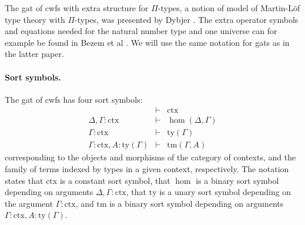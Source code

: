 \documentclass[11pt,a4paper]{article}
\theoremstyle{plain}
\theoremstyle{definition}
\newcommand{\ctx}{\mathrm{ctx}}
\newcommand{\ty}{\mathrm{ty}}
\newcommand{\tm}{\mathrm{tm}}
\begin{document}
The gat of cwfs with extra structure for $\Pi$-types, a notion of model of Martin-Löf type theory with $\Pi$-types, was presented by Dybjer \cite{dybjer:torino}. The extra operator symbols and equations needed for the natural number type and one universe can for example be found in Bezem et al \cite{bezem:hofmann}. We will use the same notation for gats as in the latter paper. 

\paragraph{Sort symbols.}
The gat of cwfs has four sort symbols:
\begin{eqnarray*}
&\vdash& \ctx\\
\Delta, \Gamma : \ctx&\vdash& \hom(\Delta,\Gamma)\\
\Gamma : \ctx&\vdash& \ty(\Gamma)\\
\Gamma : \ctx, A : \ty(\Gamma)&\vdash& \tm(\Gamma,A)
\end{eqnarray*}
corresponding to the objects and morphisms of the category of contexts, and the family of terms indexed by types in a given context, respectively. The notation states that $\ctx$ is a constant sort symbol, that $\hom$ is a binary sort symbol depending on arguments $\Delta, \Gamma : \ctx$, that $\ty$ is a unary sort symbol depending on the argument $\Gamma : \ctx$, and $\tm$ is a binary sort symbol depending on arguments $\Gamma : \ctx, A : \ty(\Gamma)$.
\end{document}
